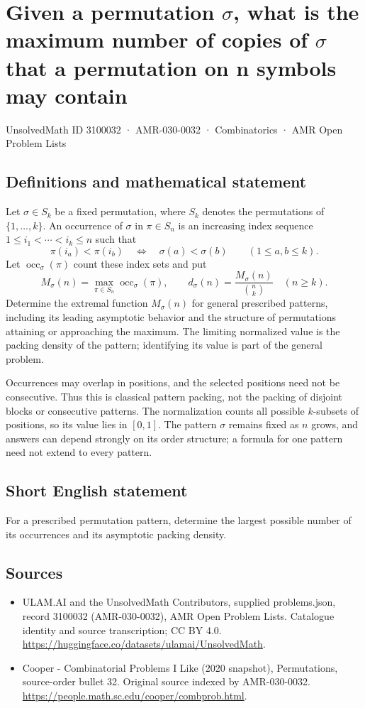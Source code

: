 \documentclass[11pt,a4paper]{article}
\begin{document}
\section*{Given a permutation $\sigma$, what is the maximum number of copies of $\sigma$ that a permutation on n symbols may contain}\label{3100032}
{\small UnsolvedMath ID 3100032 · AMR-030-0032 · Combinatorics · AMR Open Problem Lists}
\subsection{Definitions and mathematical statement}
Let $\sigma\in S_k$ be a fixed permutation, where $S_k$ denotes
the permutations of $\{1,\ldots,k\}$. An occurrence of $\sigma$
in $\pi\in S_n$ is an increasing index sequence
$1\le i_1<\cdots<i_k\le n$ such that
\[
          \pi(i_a)<\pi(i_b)\quad\Longleftrightarrow\quad
                      \sigma(a)<\sigma(b)
                 \qquad(1\le a,b\le k).
\]
Let $\operatorname{occ}_\sigma(\pi)$ count these index sets and put
\[
 M_\sigma(n)=\max_{\pi\in S_n}\operatorname{occ}_\sigma(\pi),
 \qquad d_\sigma(n)=\frac{M_\sigma(n)}{\binom nk}
                         \quad(n\ge k).
\]
Determine the extremal function $M_\sigma(n)$ for general prescribed
patterns, including its leading asymptotic behavior and the
structure of permutations attaining or approaching the maximum.
The limiting normalized value is the packing density of the
pattern; identifying its value is part of the general problem.

Occurrences may overlap in positions, and the selected positions
need not be consecutive. Thus this is classical pattern packing,
not the packing of disjoint blocks or consecutive patterns.
The normalization counts all possible $k$-subsets of positions,
so its value lies in $[0,1]$. The pattern $\sigma$ remains fixed as
$n$ grows, and answers can depend strongly on its order structure;
a formula for one pattern need not extend to every pattern.
\subsection{Short English statement}
For a prescribed permutation pattern, determine the largest possible number of its occurrences and its asymptotic packing density.
\subsection{Sources}
\begin{itemize}
\item[S1] ULAM.AI and the UnsolvedMath Contributors, supplied problems.json, record 3100032 (AMR-030-0032), AMR Open Problem Lists. Catalogue identity and source transcription; CC BY 4.0.
\url{https://huggingface.co/datasets/ulamai/UnsolvedMath}.
\item[S2] Cooper - Combinatorial Problems I Like (2020 snapshot), Permutations, source-order bullet 32. Original source indexed by AMR-030-0032.
\url{https://people.math.sc.edu/cooper/combprob.html}.
\end{itemize}
\end{document}
